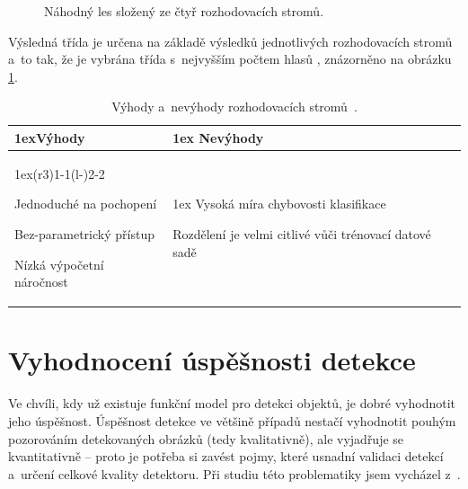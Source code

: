 \begin{figure}[H]
    \centering
    \caption{Náhodný les složený ze čtyř rozhodovacích stromů.}
    \label{fig:rozhodStromy}
\end{figure}

Výsledná třída je určena na základě výsledků jednotlivých rozhodovacích stromů a~to tak, že je vybrána třída s~nejvyšším počtem hlasů \cite{classificMethodsComp1}, znázorněno na obrázku \ref{fig:rozhodStromy}.

\begin{table}[H]
\begin{tabularx}{\linewidth}{>{\parskip1ex}X@{\kern4\tabcolsep}>{\parskip1ex}X}
\toprule
\hfil\bfseries Výhody
&
\hfil\bfseries Nevýhody
\\\cmidrule(r{3\tabcolsep}){1-1}\cmidrule(l{-\tabcolsep}){2-2}

Jednoduché na pochopení\par
Bez-parametrický přístup\par
Nízká výpočetní náročnost
&
Vysoká míra chybovosti klasifikace\par
Rozdělení je velmi citlivé vůči trénovací datové sadě

\\\bottomrule
\end{tabularx}
\caption{Výhody a~nevýhody rozhodovacích stromů~\cite{classificMethodsComp2, classificMethodsComp3}.}
\end{table}





\section{Vyhodnocení úspěšnosti detekce}
\label{vyhodnoceniUspesnosti}
Ve chvíli, kdy už existuje funkční model pro detekci objektů, je dobré vyhodnotit jeho úspěšnost. Úspěšnost detekce ve většině případů nestačí vyhodnotit pouhým pozorováním detekovaných obrázků (tedy kvalitativně), ale vyjadřuje se kvantitativně -- proto je potřeba si zavést pojmy, které usnadní validaci detekcí a~určení celkové kvality detektoru. Při studiu této problematiky jsem vycházel z~\cite{mAP}.

